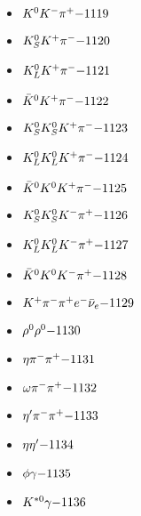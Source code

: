 \begin{multicols}{3}
\begin{itemize}
 \item $ K^{0} K^{-} \pi^{+} \hfill{-1119}$
 \item $ K_{S}^{0} K^{+} \pi^{-} \hfill{-1120}$
 \item $ K_{L}^{0} K^{+} \pi^{-} \hfill{-1121}$
 \item $ \bar{K}^{0} K^{+} \pi^{-} \hfill{-1122}$
 \item $ K_{S}^{0} K_{S}^{0} K^{+} \pi^{-} \hfill{-1123}$
 \item $ K_{L}^{0} K_{L}^{0} K^{+} \pi^{-} \hfill{-1124}$
 \item $ \bar{K}^{0} K^{0} K^{+} \pi^{-} \hfill{-1125}$
 \item $ K_{S}^{0} K_{S}^{0} K^{-} \pi^{+} \hfill{-1126}$
 \item $ K_{L}^{0} K_{L}^{0} K^{-} \pi^{+} \hfill{-1127}$
 \item $ \bar{K}^{0} K^{0} K^{-} \pi^{+} \hfill{-1128}$
 \item $ K^{+} \pi^{-} \pi^{+} e^{-} \bar{\nu}_{e} \hfill{-1129}$
 \item $ \rho^{0} \rho^{0} \hfill{-1130}$
 \item $ \eta \pi^{-} \pi^{+} \hfill{-1131}$
 \item $ \omega \pi^{-} \pi^{+} \hfill{-1132}$
 \item $ {\eta^{\prime}} \pi^{-} \pi^{+} \hfill{-1133}$
 \item $ \eta {\eta^{\prime}} \hfill{-1134}$
 \item $ \phi \gamma \hfill{-1135}$
 \item $ K^{*0} \gamma \hfill{-1136}$
 \end{itemize} 
 \end{multicols} 
